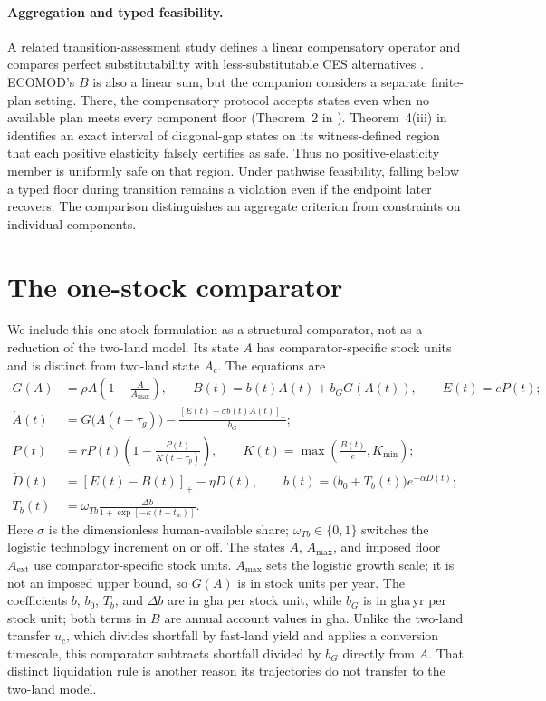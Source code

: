 \documentclass[11pt,a4paper]{article}
\newcommand{\pos}[1]{\left[#1\right]_+}
\begin{document}
\paragraph{Aggregation and typed feasibility.} A related transition-assessment study defines a linear compensatory operator and compares perfect substitutability with less-substitutable CES alternatives \citep[Sections~2 and 4 of][]{Abaee2026b}. ECOMOD's $B$ is also a linear sum, but the companion considers a separate finite-plan setting. There, the compensatory protocol accepts states even when no available plan meets every component floor (Theorem~2 in \citet{Abaee2026b}). Theorem~4(iii) in \citet{Abaee2026b} identifies an exact interval of diagonal-gap states on its witness-defined region that each positive elasticity falsely certifies as safe. Thus no positive-elasticity member is uniformly safe on that region. Under pathwise feasibility, falling below a typed floor during transition remains a violation even if the endpoint later recovers. The comparison distinguishes an aggregate criterion from constraints on individual components.

\section{The one-stock comparator}\label{si:onestock}

We include this one-stock formulation as a structural comparator, not as a reduction of the two-land model. Its state $A$ has comparator-specific stock units and is distinct from two-land state $A_c$. The equations are
\begin{align*}
G(A)&=\rho A\left(1-\frac{A}{A_{\max}}\right),\qquad
B(t)=b(t)A(t)+b_GG(A(t)),\qquad E(t)=eP(t);\\
\dot A(t)&=G\bigl(A(t-\tau_g)\bigr)-\frac{\pos{E(t)-\sigma b(t)A(t)}}{b_G};\\
\dot P(t)&=rP(t)\left(1-\frac{P(t)}{K(t-\tau_p)}\right),\qquad
K(t)=\max\!\left(\frac{B(t)}{e},K_{\min}\right);\\
\dot D(t)&=\pos{E(t)-B(t)}-\eta D(t),\qquad
b(t)=\bigl(b_0+T_b(t)\bigr)e^{-\alpha D(t)};\\
T_b(t)&=\omega_{Tb}\frac{\Delta b}{1+\exp[-\kappa(t-t_w)]}.
\end{align*}
Here $\sigma$ is the dimensionless human-available share; $\omega_{Tb}\in\{0,1\}$ switches the logistic technology increment on or off. The states $A$, $A_{\max}$, and imposed floor $A_{\mathrm{ext}}$ use comparator-specific stock units. $A_{\max}$ sets the logistic growth scale; it is not an imposed upper bound, so $G(A)$ is in stock units per year. The coefficients $b$, $b_0$, $T_b$, and $\Delta b$ are in gha per stock unit, while $b_G$ is in gha\,yr per stock unit; both terms in $B$ are annual account values in gha. Unlike the two-land transfer $u_c$, which divides shortfall by fast-land yield and applies a conversion timescale, this comparator subtracts shortfall divided by $b_G$ directly from $A$. That distinct liquidation rule is another reason its trajectories do not transfer to the two-land model.
\end{document}
